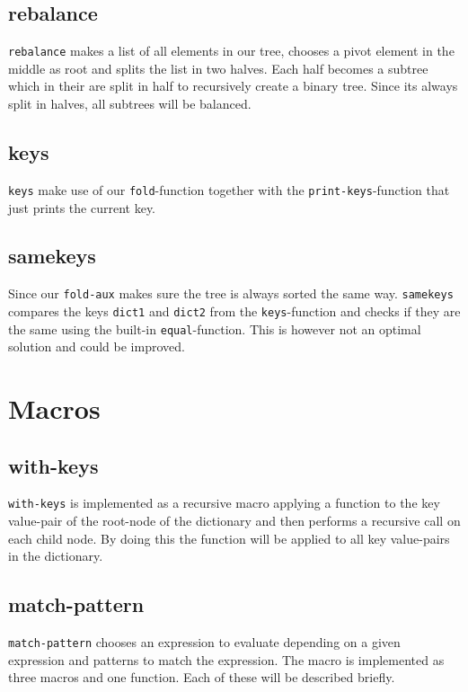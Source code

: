 \documentclass[a4paper,11pt]{article}
\begin{document}
\subsection{rebalance}
\texttt{rebalance} makes a list of all elements in our tree, chooses a pivot element in the middle as root and splits the list in two halves. Each half becomes a subtree which in their are split in half to recursively create a binary tree. Since its always split in halves, all subtrees will be balanced.

\subsection{keys}
\texttt{keys} make use of our \texttt{fold}-function together with the \texttt{print-keys}-function that just prints the current key.

\subsection{samekeys}
Since our \texttt{fold-aux} makes sure the tree is always sorted the same way. \texttt{samekeys} compares the keys \texttt{dict1} and \texttt{dict2} from the \texttt{keys}-function and checks if they are the same using the built-in \texttt{equal}-function. This is however not an optimal solution and could be improved.

\section{Macros}

\subsection{with-keys}
\texttt{with-keys} is implemented as a recursive macro applying a function to the key value-pair of the root-node of the dictionary and then performs a recursive call on each child node. By doing this the function will be applied to all key value-pairs in the dictionary.

\subsection{match-pattern}

\texttt{match-pattern} chooses an expression to evaluate depending on a given expression and patterns to match the expression. The macro is implemented as three macros and one function. Each of these will be described briefly.
\end{document}

